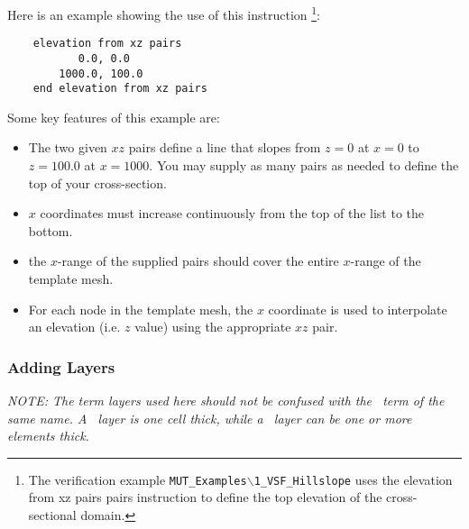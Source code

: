 Here is an example showing the use of this instruction \footnote{The verification example \texttt{MUT\_Examples$\backslash$1\_VSF\_Hillslope} uses the \textsf{elevation from xz pairs} pairs instruction to define the top elevation of the cross-sectional domain.}:
    \begin{verbatim}
    elevation from xz pairs
           0.0, 0.0
        1000.0, 100.0
    end elevation from xz pairs
     \end{verbatim}
     \squish
Some key features of this example are:
\begin{itemize}
  \item The two given $xz$ pairs define a line that slopes from $z=0$ at $x=0$ to $z=100.0$ at $x=1000$.  You may supply as many pairs as needed to define the top of your cross-section.
  \item $x$ coordinates must increase continuously from the top of the list to the bottom.
  \item the $x$-range of the supplied pairs should cover the entire $x$-range of the template mesh.
  \item For each node in the template mesh, the $x$ coordinate is used to interpolate an elevation (i.e. $z$ value) using the appropriate $xz$ pair.
\end{itemize}

\subsubsection{Adding Layers} 
    {\em NOTE: The term layers used here should not be confused with the \mf\ term of the same name. A \mf\ layer is one cell thick, while a \mut\ layer can be one or more elements thick.}

